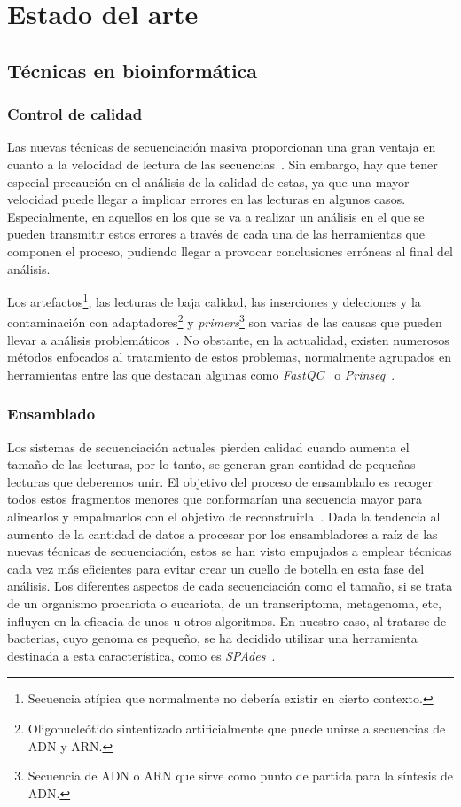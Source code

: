 \chapter{Estado del arte}
\label{chap:estadodelarte}

\section{Técnicas en bioinformática}
\subsection{Control de calidad}
Las nuevas técnicas de secuenciación masiva proporcionan una gran ventaja en cuanto a la velocidad de lectura de las secuencias~\cite{ngs}. Sin embargo, hay que tener especial precaución en el análisis de la calidad de estas, ya que una mayor velocidad puede llegar a implicar errores en las lecturas en algunos casos. Especialmente, en aquellos en los que se va a realizar un análisis en el que se pueden transmitir estos errores a través de cada una de las herramientas que componen el proceso, pudiendo llegar a provocar conclusiones erróneas al final del análisis.

Los artefactos\footnote{Secuencia atípica que normalmente no debería existir en cierto contexto.}, las lecturas de baja calidad, las inserciones y deleciones y la contaminación con adaptadores\footnote{Oligonucleótido sintentizado artificialmente que puede unirse a secuencias de ADN y ARN.} y \textit{primers}\footnote{Secuencia de ADN o ARN que sirve como punto de partida para la síntesis de ADN.} son varias de las causas que pueden llevar a análisis problemáticos~\cite{plosone}. No obstante, en la actualidad, existen numerosos métodos enfocados al tratamiento de estos problemas, normalmente agrupados en herramientas entre las que destacan algunas como \textit{FastQC}~\cite{fastqc} o \textit{Prinseq}~\cite{schmieder_prinseq}.

\subsection{Ensamblado}
Los sistemas de secuenciación actuales pierden calidad cuando aumenta el tamaño de las lecturas, por lo tanto, se generan gran cantidad de pequeñas lecturas que deberemos unir. El objetivo del proceso de ensamblado es recoger todos estos fragmentos menores que conformarían una secuencia mayor para alinearlos y empalmarlos con el objetivo de reconstruirla~\cite{assembly_wiki}. Dada la tendencia al aumento de la cantidad de datos a procesar por los ensambladores a raíz de las nuevas técnicas de secuenciación, estos se han visto empujados a emplear técnicas cada vez más eficientes para evitar crear un cuello de botella en esta fase del análisis. Los diferentes aspectos de cada secuenciación como el tamaño, si se trata de un organismo procariota o eucariota, de un transcriptoma, metagenoma, etc, influyen en la eficacia de unos u otros algoritmos. En nuestro caso, al tratarse de bacterias, cuyo genoma es pequeño, se ha decidido utilizar una herramienta destinada a esta característica, como es \textit{SPAdes}~\cite{Nurk2013}. 

